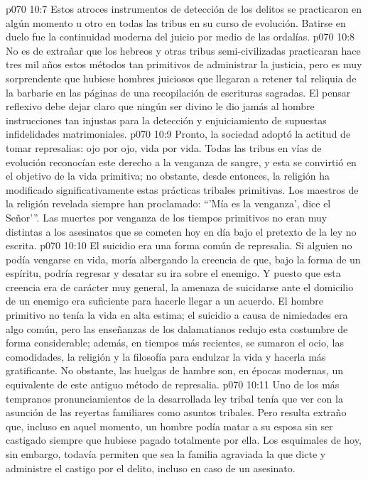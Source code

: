 \vs p070 10:7 Estos atroces instrumentos de detección de los delitos se practicaron en algún momento u otro en todas las tribus en su curso de evolución. Batirse en duelo fue la continuidad moderna del juicio por medio de las ordalías.
\vs p070 10:8 No es de extrañar que los hebreos y otras tribus semi\hyp{}civilizadas practicaran hace tres mil años estos métodos tan primitivos de administrar la justicia, pero es muy sorprendente que hubiese hombres juiciosos que llegaran a retener tal reliquia de la barbarie en las páginas de una recopilación de escrituras sagradas. El pensar reflexivo debe dejar claro que ningún ser divino le dio jamás al hombre instrucciones tan injustas para la detección y enjuiciamiento de supuestas infidelidades matrimoniales.
\vs p070 10:9 \pc Pronto, la sociedad adoptó la actitud de tomar represalias: ojo por ojo, vida por vida. Todas las tribus en vías de evolución reconocían este derecho a la venganza de sangre, y esta se convirtió en el objetivo de la vida primitiva; no obstante, desde entonces, la religión ha modificado significativamente estas prácticas tribales primitivas. Los maestros de la religión revelada siempre han proclamado: “'Mía es la venganza', dice el Señor’”. Las muertes por venganza de los tiempos primitivos no eran muy distintas a los asesinatos que se cometen hoy en día bajo el pretexto de la ley no escrita.
\vs p070 10:10 El suicidio era una forma común de represalia. Si alguien no podía vengarse en vida, moría albergando la creencia de que, bajo la forma de un espíritu, podría regresar y desatar su ira sobre el enemigo. Y puesto que esta creencia era de carácter muy general, la amenaza de suicidarse ante el domicilio de un enemigo era suficiente para hacerle llegar a un acuerdo. El hombre primitivo no tenía la vida en alta estima; el suicidio a causa de nimiedades era algo común, pero las enseñanzas de los dalamatianos redujo esta costumbre de forma considerable; además, en tiempos más recientes, se sumaron el ocio, las comodidades, la religión y la filosofía para endulzar la vida y hacerla más gratificante. No obstante, las huelgas de hambre son, en épocas modernas, un equivalente de este antiguo método de represalia.
\vs p070 10:11 Uno de los más tempranos pronunciamientos de la desarrollada ley tribal tenía que ver con la asunción de las reyertas familiares como asuntos tribales. Pero resulta extraño que, incluso en aquel momento, un hombre podía matar a su esposa sin ser castigado siempre que hubiese pagado totalmente por ella. Los esquimales de hoy, sin embargo, todavía permiten que sea la familia agraviada la que dicte y administre el castigo por el delito, incluso en caso de un asesinato.
